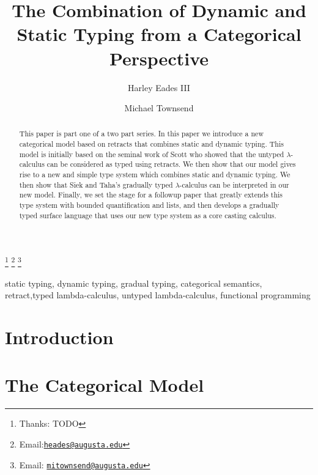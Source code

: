 \documentclass{entcs}
\begin{document}
\begin{frontmatter}
  \title{The Combination of Dynamic and Static Typing from a Categorical Perspective}
  \author{Harley Eades III}
  \address{Computer and Information Sciences\\ Augusta University\\
    Augusta, USA}
  \author{Michael Townsend}
  \address{Computer and Information Sciences\\ Augusta University\\
    Augusta, USA}

  \thanks[ALL]{Thanks: TODO}
  \thanks[myemail]{Email:\href{mailto:heades@augusta.edu} {\texttt{\normalshape heades@augusta.edu}}}
  \thanks[coemail]{Email: \href{mailto:mitownsend@augusta.edu} {\texttt{\normalshape mitownsend@augusta.edu}}}
  \begin{abstract} 
    This paper is part one of a two part series.  In this paper we
    introduce a new categorical model based on retracts that combines
    static and dynamic typing.  This model is initially based on the
    seminal work of Scott who showed that the untyped
    $\lambda$-calculus can be considered as typed using retracts.  We
    then show that our model gives rise to a new and simple type
    system which combines static and dynamic typing.  We then show
    that Siek and Taha's gradually typed $\lambda$-calculus can be
    interpreted in our new model.  Finally, we set the stage for a
    followup paper that greatly extends this type system with bounded
    quantification and lists, and then develops a gradually typed
    surface language that uses our new type system as a core casting
    calculus.
  \end{abstract}
  \begin{keyword}  
    static typing, dynamic typing, gradual typing, categorical
    semantics, retract,typed lambda-calculus, untyped lambda-calculus,
    functional programming
  \end{keyword}
\end{frontmatter}

\section{Introduction}
\label{sec:introduction}


\section{The Categorical Model}
\label{subsec:the_categorical_model}

\end{document}
